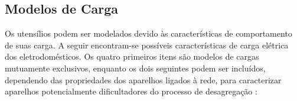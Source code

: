 \subsection{Modelos de Carga}
\label{ssec:modelos_carga}

Os utensílios podem ser modelados devido às características de
comportamento de suas carga. A seguir encontram-se possíveis
características de carga elétrica dos eletrodomésticos. Os quatro
primeiros itens são modelos de cargas mutuamente exclusivos, enquanto
os dois seguintes podem ser incluídos, dependendo das propriedades dos
aparelhos ligados à rede, para caracterizar aparelhos potencialmente
dificultadores do processo de desagregação \cite[com adaptações]{
nilm_hart_1992_8,nilm_zeifman_review_2011,nilm_zeifman_nonintrusive_2011,
nilm_apresentacao_review_2011,nilm_liang_pt2_2010_40}:

